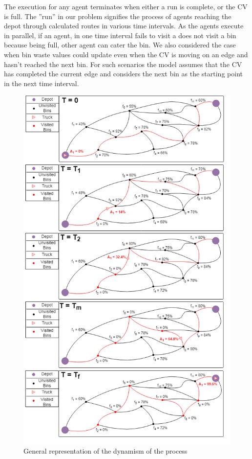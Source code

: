 \documentclass[12pt]{article}
\begin{document}
The execution for any agent terminates when either a run is complete, or the CV is full. The ”run” in our problem signifies the process of agents reaching the depot through calculated routes in various time intervals. As the agents execute in parallel, if an agent, in one time interval fails to visit a does not visit a bin because being full, other agent can cater the bin. We also considered the case when bin waste values could update even when the CV is moving on an edge and hasn't reached the next bin. For such scenarios the model assumes that the CV has completed the current edge and considers the next bin as the starting point in the next time interval. 

\begin{figure}[H]
    \centering
    \includegraphics[scale=0.6]{ExplanationFigure.png}
    \caption{General representation of the dynamism of the process}\label{fige}
\end{figure}
\end{document}
